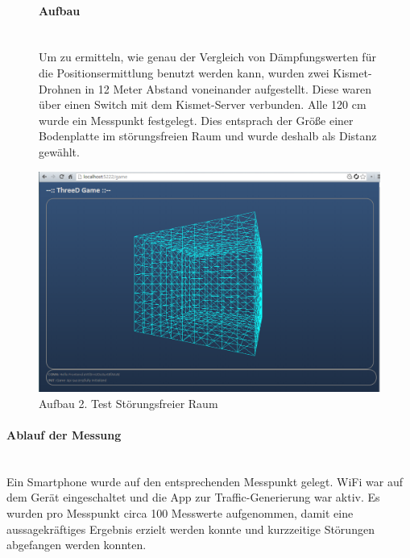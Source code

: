 \documentclass[a4paper]{spie}  %
\begin{document}
\begin{figure}[H]
\begin{minipage}[t]{0.4\textwidth}
\vspace{0pt}
\paragraph{Aufbau}\mbox{}\\
Um zu ermitteln, wie genau der Vergleich von Dämpfungswerten für die Positionsermittlung benutzt werden kann, wurden zwei Kismet-Drohnen in 12 Meter Abstand voneinander aufgestellt. Diese waren über einen Switch mit dem Kismet-Server verbunden. Alle 120 cm wurde ein Messpunkt festgelegt. Dies entsprach der Größe einer Bodenplatte im störungsfreien Raum und wurde deshalb als Distanz gewählt.
\end{minipage}
\hfill
\begin{minipage}[t]{0.5\textwidth}
\vspace{0pt}
		\includegraphics[width=\textwidth]{./images/FrontendInit.png}
		\caption{Aufbau 2. Test Störungsfreier Raum}
		\label{fig:test2}
\end{minipage}
\end{figure}

\paragraph{Ablauf der Messung}\mbox{}\\
Ein Smartphone wurde auf den entsprechenden Messpunkt gelegt. WiFi war auf dem Gerät eingeschaltet und die App zur Traffic-Generierung war aktiv. Es wurden pro Messpunkt circa 100 Messwerte aufgenommen, damit eine aussagekräftiges Ergebnis erzielt werden konnte und kurzzeitige Störungen abgefangen werden konnten.
\end{document}
